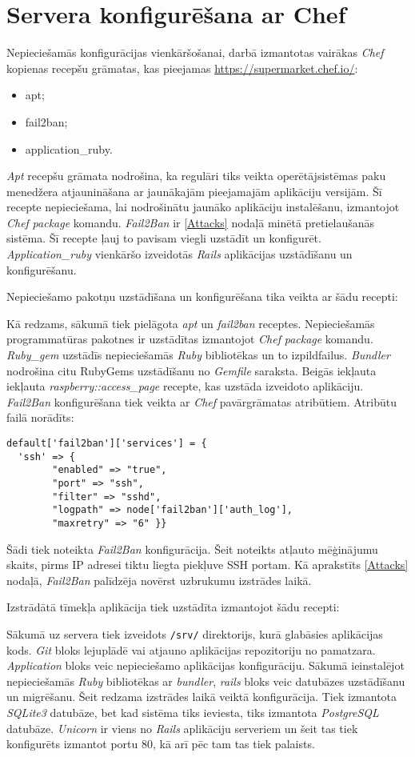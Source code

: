 \section{Servera konfigurēšana ar Chef}
Nepieciešamās konfigurācijas vienkāršošanai, darbā izmantotas vairākas \textit{Chef} kopienas recepšu grāmatas, kas pieejamas \url{https://supermarket.chef.io/}:
\begin{itemize}
	\item apt;
	\item fail2ban;
	\item application_ruby.
\end{itemize}
\textit{Apt} recepšu grāmata nodrošina, ka regulāri tiks veikta operētājsistēmas paku menedžera atjaunināšana ar jaunākajām pieejamajām aplikāciju versijām. Šī recepte nepieciešama, lai nodrošinātu jaunāko aplikāciju instalēšanu, izmantojot \textit{Chef} \textit{package} komandu.
\textit{Fail2Ban} ir \ref{Attacks} nodaļā minētā pretielaušanās sistēma. Šī recepte ļauj to pavisam viegli uzstādīt un konfigurēt.
\textit{Application_ruby} vienkāršo izveidotās \textit{Rails} aplikācijas uzstādīšanu un konfigurēšanu.

Nepieciešamo pakotņu uzstādīšana un konfigurēšana tika veikta ar šādu recepti:

Kā redzams, sākumā tiek pielāgota \textit{apt} un \textit{fail2ban} receptes. Nepieciešamās programmatūras pakotnes ir uzstādītas izmantojot \textit{Chef} \textit{package} komandu. \textit{Ruby_gem} uzstādīs nepieciešamās \textit{Ruby} bibliotēkas un to izpildfailus. \textit{Bundler} nodrošina citu RubyGems uzstādīšanu no \textit{Gemfile} saraksta.
Beigās iekļauta iekļauta \textit{raspberry::access_page} recepte, kas uzstāda izveidoto aplikāciju. \textit{Fail2Ban} konfigurēšana tiek veikta ar \textit{Chef} pavārgrāmatas atribūtiem. Atribūtu failā norādīts:
\begin{lstlisting}
default['fail2ban']['services'] = {
  'ssh' => {
        "enabled" => "true",
        "port" => "ssh",
        "filter" => "sshd",
        "logpath" => node['fail2ban']['auth_log'],
        "maxretry" => "6" }}
\end{lstlisting}
Šādi tiek noteikta \textit{Fail2Ban} konfigurācija. Šeit noteikts atļauto mēģinājumu skaits, pirms IP adresei tiktu liegta piekļuve SSH portam. Kā aprakstīts \ref{Attacks} nodaļā, \textit{Fail2Ban} palīdzēja novērst uzbrukumu izstrādes laikā.

Izstrādātā tīmekļa aplikācija tiek uzstādīta izmantojot šādu recepti:

Sākumā uz servera tiek izveidots \texttt{/srv/} direktorijs, kurā glabāsies aplikācijas kods. \textit{Git} bloks lejuplādē vai atjauno aplikācijas repozitoriju no pamatzara. \textit{Application} bloks veic nepieciešamo aplikācijas konfigurāciju. Sākumā ieinstalējot nepieciešamās \textit{Ruby} bibliotēkas ar \textit{bundler}, \textit{rails} bloks veic datubāzes uzstādīšanu un migrēšanu. Šeit redzama izstrādes laikā veiktā konfigurācija. Tiek izmantota \textit{SQLite3} datubāze, bet kad sistēma tiks ieviesta, tiks izmantota \textit{PostgreSQL} datubāze. \textit{Unicorn} ir viens no \textit{Rails} aplikāciju serveriem un šeit tas tiek konfigurēts izmantot portu 80, kā arī pēc tam tas tiek palaists.

